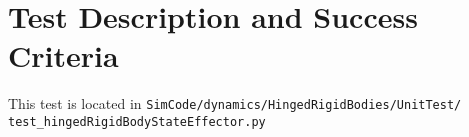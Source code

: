 \section{Test Description and Success Criteria}
This test is located in \tt SimCode/dynamics/HingedRigidBodies/UnitTest/\newline
test\_hingedRigidBodyStateEffector.py 
